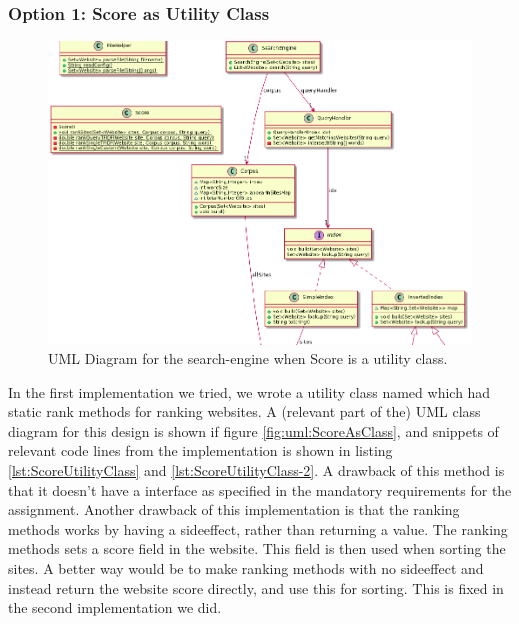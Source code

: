 \subsubsection{Option 1: Score as Utility Class}
\begin{figure}[t]
	\centering
	\includegraphics[width=\textwidth]{graphics/uml/ScoreAsUtilityZoom.png}
	\caption{UML Diagram for the search-engine when Score is a utility class.}
	\label{fig:uml:ScoreAsUtility}
\end{figure}

In the first implementation we tried, we wrote a utility class named  which had static rank methods for ranking websites.   
A (relevant part of the) UML class diagram for this design is shown if figure \ref{fig:uml:ScoreAsClass}, and snippets of relevant code lines from the implementation is shown in listing \ref{lst:ScoreUtilityClass} and \ref{lst:ScoreUtilityClass-2}. 
A drawback of this method is that it doesn't have a  interface as specified in the mandatory requirements for the assignment.
Another drawback of this implementation is that the ranking methods works by having a sideeffect, rather than returning a value. The ranking methods sets a score field in the website. This field is then used when sorting the sites. A better way would be to make ranking methods with no sideeffect and instead return the website score directly, and use this for sorting. This is fixed in the second implementation we did.      


